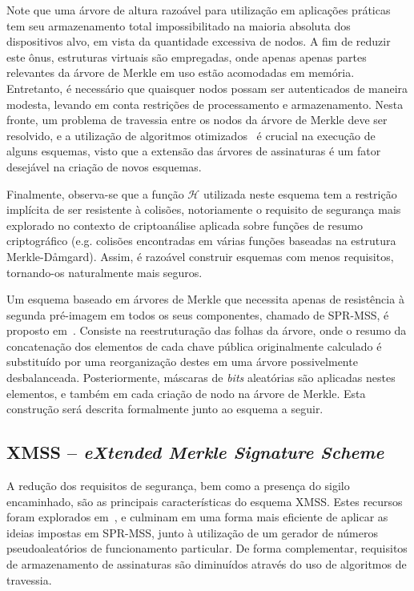 \documentclass[12pt]{report}
\newcommand{\hh}{\mathcal{H}}
\begin{document}
Note que uma árvore de altura razoável para utilização em aplicações práticas tem seu armazenamento total impossibilitado na maioria absoluta dos dispositivos alvo, em vista da quantidade excessiva de nodos. A fim de reduzir este ônus, estruturas virtuais são empregadas, onde apenas apenas partes relevantes da árvore de Merkle em uso estão acomodadas em memória. Entretanto, é necessário que quaisquer nodos possam ser autenticados de maneira modesta, levando em conta restrições de processamento e armazenamento. Nesta fronte, um problema de travessia entre os nodos da árvore de Merkle deve ser resolvido, e a utilização de algoritmos otimizados~\cite{Buchmann:2008:MTT:1473109.1473114} é crucial na execução de alguns esquemas, visto que a extensão das árvores de assinaturas é um fator desejável na criação de novos esquemas.

Finalmente, observa-se que a função $\hh{}$ utilizada neste esquema tem a restrição implícita de ser resistente à colisões, notoriamente o requisito de segurança mais explorado no contexto de criptoanálise aplicada sobre funções de resumo criptográfico (e.g. colisões encontradas em várias funções baseadas na estrutura Merkle-D\aa{}mgard). Assim, é razoável construir esquemas com menos requisitos, tornando-os naturalmente mais seguros.

Um esquema baseado em árvores de Merkle que necessita apenas de resistência à segunda pré-imagem em todos os seus componentes, chamado de SPR-MSS, é proposto em~\cite{Dahmen:2008:DSO:1473109.1473117}. Consiste na reestruturação das folhas da árvore, onde o resumo da concatenação dos elementos de cada chave pública originalmente calculado é substituído por uma reorganização destes em uma árvore possivelmente desbalanceada. Posteriormente, máscaras de \emph{bits} aleatórias são aplicadas nestes elementos, e também em cada criação de nodo na árvore de Merkle. Esta construção será descrita formalmente junto ao esquema a seguir.

\subsection{XMSS -- \emph{eXtended Merkle Signature Scheme}}

A redução dos requisitos de segurança, bem como a presença do sigilo encaminhado, são as principais características do esquema XMSS. Estes recursos foram explorados em~\cite{Buchmann:2011:XPF:2184003.2184011}, e culminam em uma forma mais eficiente de aplicar as ideias impostas em SPR-MSS, junto à utilização de um gerador de números pseudoaleatórios de funcionamento particular. De forma complementar, requisitos de armazenamento de assinaturas são diminuídos através do uso de algoritmos de travessia.
\end{document}
